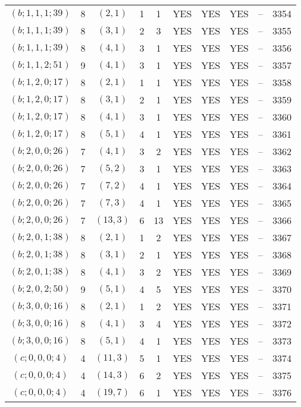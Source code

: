\begin{longtable}{|c|c|c|c|c|c|c|c|c|c|}
$(b; 1, 1, 1; 39)$ & 8 & $(2, 1)$ & 1 & 1 & YES & YES & YES & -- & 3354\\
$(b; 1, 1, 1; 39)$ & 8 & $(3, 1)$ & 2 & 3 & YES & YES & YES & -- & 3355\\
$(b; 1, 1, 1; 39)$ & 8 & $(4, 1)$ & 3 & 1 & YES & YES & YES & -- & 3356\\
$(b; 1, 1, 2; 51)$ & 9 & $(4, 1)$ & 3 & 1 & YES & YES & YES & -- & 3357\\
$(b; 1, 2, 0; 17)$ & 8 & $(2, 1)$ & 1 & 1 & YES & YES & YES & -- & 3358\\
$(b; 1, 2, 0; 17)$ & 8 & $(3, 1)$ & 2 & 1 & YES & YES & YES & -- & 3359\\
$(b; 1, 2, 0; 17)$ & 8 & $(4, 1)$ & 3 & 1 & YES & YES & YES & -- & 3360\\
$(b; 1, 2, 0; 17)$ & 8 & $(5, 1)$ & 4 & 1 & YES & YES & YES & -- & 3361\\
$(b; 2, 0, 0; 26)$ & 7 & $(4, 1)$ & 3 & 2 & YES & YES & YES & -- & 3362\\
$(b; 2, 0, 0; 26)$ & 7 & $(5, 2)$ & 3 & 1 & YES & YES & YES & -- & 3363\\
$(b; 2, 0, 0; 26)$ & 7 & $(7, 2)$ & 4 & 1 & YES & YES & YES & -- & 3364\\
$(b; 2, 0, 0; 26)$ & 7 & $(7, 3)$ & 4 & 1 & YES & YES & YES & -- & 3365\\
$(b; 2, 0, 0; 26)$ & 7 & $(13, 3)$ & 6 & 13 & YES & YES & YES & -- & 3366\\
$(b; 2, 0, 1; 38)$ & 8 & $(2, 1)$ & 1 & 2 & YES & YES & YES & -- & 3367\\
$(b; 2, 0, 1; 38)$ & 8 & $(3, 1)$ & 2 & 1 & YES & YES & YES & -- & 3368\\
$(b; 2, 0, 1; 38)$ & 8 & $(4, 1)$ & 3 & 2 & YES & YES & YES & -- & 3369\\
$(b; 2, 0, 2; 50)$ & 9 & $(5, 1)$ & 4 & 5 & YES & YES & YES & -- & 3370\\
$(b; 3, 0, 0; 16)$ & 8 & $(2, 1)$ & 1 & 2 & YES & YES & YES & -- & 3371\\
$(b; 3, 0, 0; 16)$ & 8 & $(4, 1)$ & 3 & 4 & YES & YES & YES & -- & 3372\\
$(b; 3, 0, 0; 16)$ & 8 & $(5, 1)$ & 4 & 1 & YES & YES & YES & -- & 3373\\
$(c; 0, 0, 0; 4)$ & 4 & $(11, 3)$ & 5 & 1 & YES & YES & YES & -- & 3374\\
$(c; 0, 0, 0; 4)$ & 4 & $(14, 3)$ & 6 & 2 & YES & YES & YES & -- & 3375\\
$(c; 0, 0, 0; 4)$ & 4 & $(19, 7)$ & 6 & 1 & YES & YES & YES & -- & 3376\\

\end{longtable}
